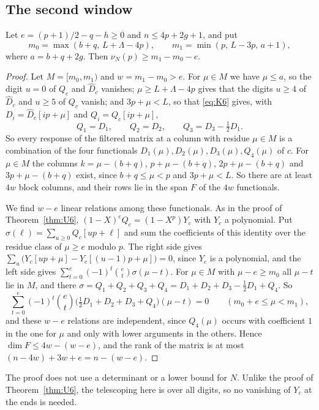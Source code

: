 \subsection{The second window}
\begin{theorem}\label{thm:S}
Let $e=(p+1)/2-q-h\ge0$ and $n\le4p+2g+1$, and put
\[
 m_0=\max(b+q,\,L+\Lambda-4p),\qquad m_1=\min(p,\,L-3p,\,a+1),
\]
where $a=b+q+2g$. Then $\nu_N(p)\ge m_1-m_0-e$.
\end{theorem}

\begin{proof}
Let $M=[m_0,m_1)$ and $w=m_1-m_0>e$. For $\mu\in M$ we have $\mu\le a$, so the digit $u=0$ of $Q_c$ and
$\widehat D_c$ vanishes; $\mu\ge L+\Lambda-4p$ gives that the digits $u\ge4$ of $\widehat D_c$ and $u\ge5$ of
$Q_c$ vanish; and $3p+\mu<L$, so that \eqref{eq:K6} gives, with $D_i=\widehat D_c[ip+\mu]$ and
$Q_i=Q_c[ip+\mu]$,
\[
 Q_1=D_1,\qquad Q_2=D_2,\qquad Q_3=D_3-\tfrac12D_1 .
\]
So every response of the filtered matrix at a column with residue $\mu\in M$ is a combination of the four
functionals $D_1(\mu),D_2(\mu),D_3(\mu),Q_4(\mu)$ of $c$. For $\mu\in M$ the columns $k=\mu-(b+q)$,
$p+\mu-(b+q)$, $2p+\mu-(b+q)$ and $3p+\mu-(b+q)$ exist, since $b+q\le\mu<p$ and $3p+\mu<L$. So there are at least
$4w$ block columns, and their rows lie in the span $F$ of the $4w$ functionals.

We find $w-e$ linear relations among these functionals. As in the proof of Theorem~\ref{thm:U6},
$(1-X)^eQ_c=(1-X^p)Y_c$ with $Y_c$ a polynomial. Put $\sigma(\ell)=\sum_{u\ge0}Q_c[up+\ell]$ and sum the
coefficients of this identity over the residue class of $\mu\ge e$ modulo $p$. The right side gives
$\sum_u\bigl(Y_c[up+\mu]-Y_c[(u-1)p+\mu]\bigr)=0$, since $Y_c$ is a polynomial, and the left side gives
$\sum_{t=0}^e(-1)^t\binom et\sigma(\mu-t)$. For $\mu\in M$ with $\mu-e\ge m_0$ all $\mu-t$ lie in $M$, and there
$\sigma=Q_1+Q_2+Q_3+Q_4=D_1+D_2+D_3-\tfrac12D_1+Q_4$. So
\[
 \sum_{t=0}^e(-1)^t\binom et\bigl(\tfrac12D_1+D_2+D_3+Q_4\bigr)(\mu-t)=0\qquad(m_0+e\le\mu<m_1),
\]
and these $w-e$ relations are independent, since $Q_4(\mu)$ occurs with coefficient $1$ in the one for $\mu$
and only with lower arguments in the others. Hence $\dim F\le4w-(w-e)$, and the rank of the matrix is at most
$(n-4w)+3w+e=n-(w-e)$.
\end{proof}

The proof does not use a determinant or a lower bound for $N$. Unlike the proof of Theorem~\ref{thm:U6}, the
telescoping here is over all digits, so no vanishing of $Y_c$ at the ends is needed.

